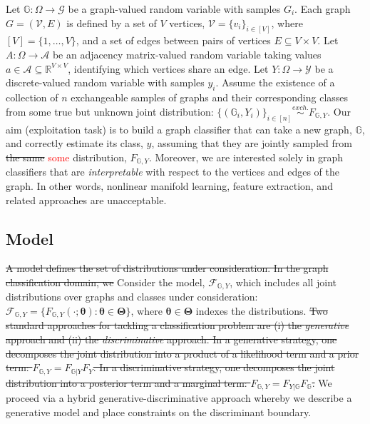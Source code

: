 \documentclass[10pt,journal,cspaper,compsoc]{IEEEtran}
\providecommand{\tr}[1]{\textcolor{red}{#1}}
\providecommand{\ve}[1]{\boldsymbol{#1}}
\newcommand{\GG}{\mathbb{G}}
\newcommand{\bth}{\ve{\theta}}
\newcommand{\bTh}{\ve{\Theta}}
\providecommand{\mc}[1]{\mathcal{#1}}
\newcommand{\Real}{\mathbb{R}}
\begin{document}
Let $\GG: \Omega \to  \mc{G}$ be a graph-valued random variable with samples $G_i$.  Each graph $G=(\mc{V},E)$ is defined by a set of $V$ vertices, $\mc{V}=\{v_i\}_{i \in [V]}$, where $[V]=\{1,\ldots, V\}$, and a set of  edges between pairs of vertices $E \subseteq V \times V$. Let $A: \Omega \to  \mc{A}$ be an adjacency matrix-valued random variable taking values $a \in \mc{A} \subseteq \Real^{V \times V}$, identifying which vertices share an edge. Let $Y:\Omega \to  \mc{Y}$ be a discrete-valued random variable with samples $y_i$.  Assume the existence of a collection of $n$ exchangeable samples of graphs and their corresponding classes from some true but unknown joint distribution: $\{(\GG_i,Y_i)\}_{i \in [n]} \overset{exch.}{\sim} F_{\GG,Y}$. Our aim (exploitation task) is to build a graph classifier that can take a new graph, $\GG$, and correctly estimate its class, $y$, assuming that they are jointly sampled from \sout{the same} \tr{some} distribution, $F_{\GG,Y}$.  Moreover, we are interested solely in graph classifiers that are \emph{interpretable} with respect to the vertices and edges of the graph. In other words, nonlinear manifold learning, feature extraction, and related approaches are unacceptable.  

\subsection{Model} %
\label{sub:model}

\sout{A model defines the set of distributions under consideration.  In the graph classification domain, we} Consider the model, $\mc{F}_{\GG,Y}$, which includes all joint distributions over graphs and classes under consideration: $\mc{F}_{\GG,Y}=\{F_{\GG, Y}(\cdot; \bth) : \bth \in \bTh\}$, where $\bth \in \bTh$ indexes the distributions.  \sout{Two standard approaches for tackling a classification problem are (i) the \emph{generative} approach and (ii) the \emph{discriminative} approach.  In a generative strategy, one decomposes the joint distribution into a product of a likelihood term and a prior term:  $F_{\GG,Y}=F_{\GG | Y}F_Y$.  In a discriminative strategy, one decomposes the joint distribution into a posterior term and a marginal term: $F_{\GG,Y}=F_{Y | \GG}F_{\GG}$.}  We proceed via a hybrid generative-discriminative approach \tr{\cite{Lasserre2006}} whereby we describe a generative model and place constraints on the discriminant boundary.
\end{document}
